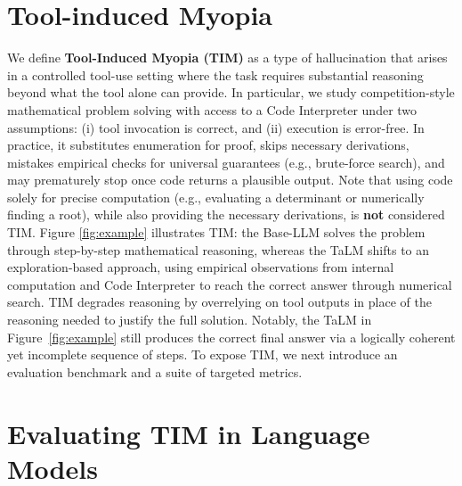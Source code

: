 \documentclass[11pt]{article}
\def \task{\textsc{TIM}\xspace}
\begin{document}
\section{Tool-induced Myopia}
We define \textbf{Tool-Induced Myopia (\task{})} as a type of hallucination that arises in a controlled tool-use setting where the task requires substantial reasoning beyond what the tool alone can provide. In particular, we study competition-style mathematical problem solving with access to a Code Interpreter under two assumptions: (i) tool invocation is correct, and (ii) execution is error-free.
In practice, it substitutes enumeration for proof, skips necessary derivations, mistakes empirical checks for universal guarantees (e.g., brute-force search), and may prematurely stop once code returns a plausible output. 
Note that using code solely for precise computation (e.g., evaluating a determinant or numerically finding a root), while also providing the necessary derivations, is \textbf{not} considered \task{}. 
Figure \ref{fig:example} illustrates \task{}: the Base-LLM solves the problem through step-by-step mathematical reasoning, whereas the TaLM shifts to an exploration-based approach, using empirical observations from internal computation and Code Interpreter to reach the correct answer through numerical search. \task{} degrades reasoning by overrelying on tool outputs in place of the reasoning needed to justify the full solution.
Notably, the TaLM in Figure~\ref{fig:example} still produces the correct final answer via a logically coherent yet incomplete sequence of steps. 
To expose \task{}, we next introduce an evaluation benchmark and a suite of targeted metrics.


\section{Evaluating \task in Language Models}
\end{document}
